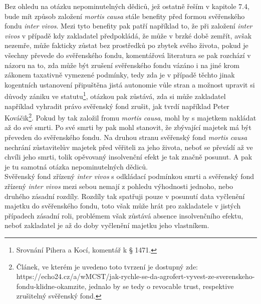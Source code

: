 \documentclass{article}
\begin{document}
Bez ohledu na otázku nepominutelných dědiců, jež ostatně řeším v kapitole 7.4, bude mít způsob založení \textit{mortis causa} stále benefity před formou svěřenského fondu \textit{inter vivos}. Mezi tyto benefity pak patří například to, že při založení \textit{inter vivos} v případě kdy zakladatel předpokládá, že může v brzké době zemřít, avšak nezemře, může fakticky zůstat bez prostředků po zbytek svého života, pokud je všechny převede do svěřenského fondu, komentářová literatura se pak rozchází v názoru na to, zda může být zrušení svěřenského fondu vázáno i na jiné krom zákonem taxativně vymezené podmínky, tedy zda je v případě těchto jinak kogentních ustanovení připuštěna jistá autonomie vůle stran a možnost upravit si důvody zániku ve statutu\footnote{Srovnání Pihera a Kocí, komentář k § 1471.}, otázkou pak zůstává, zda si může zakladatel například vyhradit právo svěřenský fond zrušit, jak tvrdí například Peter Kováčik\footnote{Článek, ve kterém je uvedeno toto tvrzení je dostupný zde: https://echo24.cz/a/wMCST/jak-rychle-se-da-agrofert-vyvest-ze-sverenskeho-fondu-klidne-okamzite, jednalo by se tedy o revocable trust, respektive zrušitelný svěřenský fond.}. Pokud by tak založil fromu \textit{mortis causa}, mohl by s majetkem nakládat až do své smrti. Po své smrti by pak mohl stanovit, že zbývající majetek má být převeden do svěřenského fondu. Na druhou stranu svěřenský fond \textit{mortis causa} nechrání zůstavitelův majetek před věřiteli za jeho života, neboť se převádí až ve chvíli jeho smrti, tolik opěvovaný insolvenční efekt je tak značně posunut. A pak je tu samotná otázka nepominutelných dědiců.\\


Svěřenský fond zřízený \textit{inter vivos} s odkládací podmínkou smrti a svěřenský fond zřízený \textit{inter vivos} mezi sebou nemají z pohledu výhodnosti jednoho, nebo druhého zásadní rozdíly. Rozdíly tak spatřuji pouze v posunutí data vyčlenění majetku do svěřenského fondu, toto však může hrát pro zakladatele v jistých případech zásadní roli, problémem však zůstává absence insolvenčního efektu, neboť zakladatel je až do doby vyčlenění majetku jeho vlastníkem.\\

\end{document}
